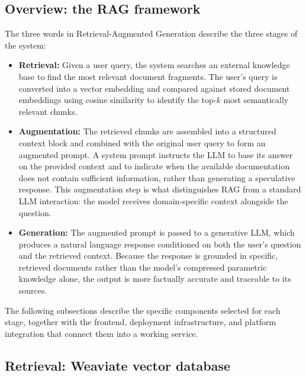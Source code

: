 \subsection{Overview: the RAG framework}
\label{sec:rag_framework}

The three words in Retrieval-Augmented Generation describe the three stages of the system:

\begin{itemize}
\item\textbf{Retrieval:} Given a user query, the system searches an external knowledge base to find the most relevant document fragments. The user's query is converted into a vector embedding and compared against stored document embeddings using cosine similarity to identify the top-$k$ most semantically relevant chunks. 
\item\textbf{Augmentation:} The retrieved chunks are assembled into a structured context block and combined with the original user query to form an augmented prompt. A system prompt instructs the LLM to base its answer on the provided context and to indicate when the available documentation does not contain sufficient information, rather than generating a speculative response. This augmentation step is what distinguishes \gls{RAG} from a standard LLM interaction: the model receives domain-specific context alongside the question.
\item\textbf{Generation:} The augmented prompt is passed to a generative LLM, which produces a natural language response conditioned on both the user's question and the retrieved context. Because the response is grounded in specific, retrieved documents rather than the model's compressed parametric knowledge alone, the output is more factually accurate and traceable to its sources.
\end{itemize}

The following subsections describe the specific components selected for each stage, together with the frontend, deployment infrastructure, and platform integration that connect them into a working service.
 
\subsection{Retrieval: Weaviate vector database}
\label{sec:weaviate}
 
